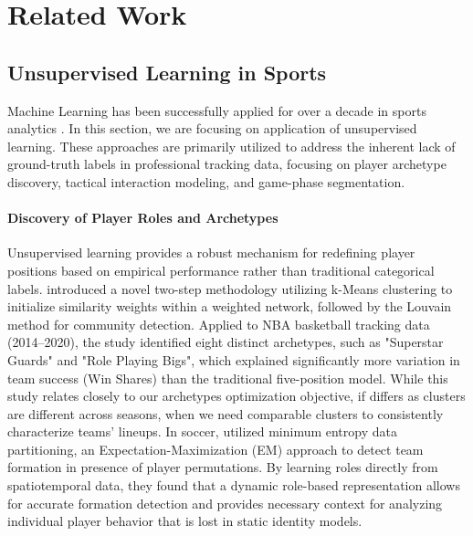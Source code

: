 \section{Related Work}
\label{sec:rw}

\subsection{Unsupervised Learning in Sports}

Machine Learning has been successfully applied for over a decade in sports analytics \citep{Memmert2025artificial}.
In this section, we are focusing on application of unsupervised learning.
These approaches are primarily utilized to address the inherent lack of ground-truth labels in professional tracking data, focusing on player archetype discovery, tactical interaction modeling, and game-phase segmentation.

\paragraph{Discovery of Player Roles and Archetypes}
Unsupervised learning provides a robust mechanism for redefining player positions based on empirical performance rather than traditional categorical labels.
\cite{muniz_weighted_2022} introduced a novel two-step methodology utilizing k-Means clustering to initialize similarity weights within a weighted network, followed by the Louvain method for community detection. 
Applied to NBA basketball tracking data (2014–2020), the study identified eight distinct archetypes, such as "Superstar Guards" and "Role Playing Bigs", which explained significantly more variation in team success (Win Shares) than the traditional five-position model.
While this study relates closely to our archetypes optimization objective, if differs as clusters are different across seasons, when we need comparable clusters to consistently characterize teams' lineups. 
In soccer, \cite{Bialkowski2014large} utilized minimum entropy data partitioning, an Expectation-Maximization (EM) approach to detect team formation in presence of player permutations.
By learning roles directly from spatiotemporal data, they found that a dynamic role-based representation allows for accurate formation detection and provides necessary context for analyzing individual player behavior that is lost in static identity models.

